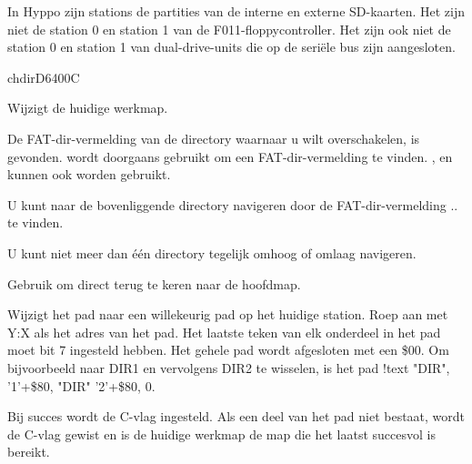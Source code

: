 In Hyppo zijn stations de partities van de interne en externe SD-kaarten. Het zijn niet de station 0 en station 1 van de F011-floppycontroller. Het zijn ook niet de station 0 en station 1 van dual-drive-units die op de seriële bus zijn aangesloten.


\begin{hyppotrap}{chdir}{D640}{0C}

\item [Dienst:]  Wijzigt de huidige werkmap.

\item [Voorbeding:]  De FAT-dir-vermelding van de directory waarnaar u wilt overschakelen, is gevonden.  wordt doorgaans gebruikt om een FAT-dir-vermelding te vinden.
  ,  en  kunnen ook worden gebruikt.

\item [Foutcodes:]

\item [Geschiedenis:]
\item [Opmerkingen:]  U kunt naar de bovenliggende directory navigeren door de FAT-dir-vermelding .. te vinden.

  U kunt niet meer dan één directory tegelijk omhoog of omlaag navigeren.

  Gebruik  om direct terug te keren naar de hoofdmap.\item [Voorbeeld:]  Wijzigt het pad naar een willekeurig pad op het huidige station. Roep aan met Y:X als het adres van het pad. Het laatste teken van elk onderdeel in het pad moet bit 7 ingesteld hebben. Het gehele pad wordt afgesloten met een \$00. Om bijvoorbeeld naar DIR1 en vervolgens DIR2 te wisselen, is het pad {\codefont !text "DIR", '1'+\$80, "DIR" '2'+\$80, 0}.

  Bij succes wordt de C-vlag ingesteld. Als een deel van het pad niet bestaat, wordt de C-vlag gewist en is de huidige werkmap de map die het laatst succesvol is bereikt.
\end{hyppotrap}

